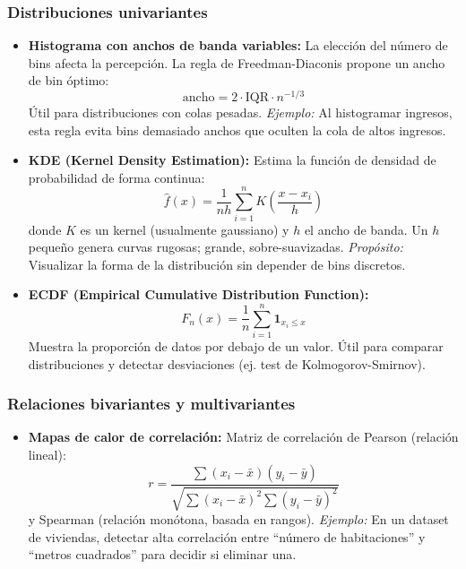 \documentclass[12pt,a4paper,openany,oneside]{book}
\begin{document}
\subsubsection{Distribuciones univariantes}
\begin{itemize}
    \item \textbf{Histograma con anchos de banda variables:} La elección del número de bins afecta la percepción. La regla de Freedman-Diaconis propone un ancho de bin óptimo:
    \[
    \text{ancho} = 2 \cdot \text{IQR} \cdot n^{-1/3}
    \]
    Útil para distribuciones con colas pesadas. \textit{Ejemplo:} Al histogramar ingresos, esta regla evita bins demasiado anchos que oculten la cola de altos ingresos.

    \item \textbf{KDE (Kernel Density Estimation):} Estima la función de densidad de probabilidad de forma continua:
    \[
    \hat{f}(x) = \frac{1}{nh}\sum_{i=1}^n K\left(\frac{x-x_i}{h}\right)
    \]
    donde $K$ es un kernel (usualmente gaussiano) y $h$ el ancho de banda. Un $h$ pequeño genera curvas rugosas; grande, sobre-suavizadas. \textit{Propósito:} Visualizar la forma de la distribución sin depender de bins discretos.

    \item \textbf{ECDF (Empirical Cumulative Distribution Function):}
    \[
    F_n(x) = \frac{1}{n}\sum_{i=1}^n \mathbf{1}_{x_i \leq x}
    \]
    Muestra la proporción de datos por debajo de un valor. Útil para comparar distribuciones y detectar desviaciones (ej. test de Kolmogorov-Smirnov).
\end{itemize}

\subsubsection{Relaciones bivariantes y multivariantes}
\begin{itemize}
    \item \textbf{Mapas de calor de correlación:} Matriz de correlación de Pearson (relación lineal):
    \[
    r = \frac{\sum (x_i - \bar{x})(y_i - \bar{y})}{\sqrt{\sum (x_i - \bar{x})^2 \sum (y_i - \bar{y})^2}}
    \]
    y Spearman (relación monótona, basada en rangos). \textit{Ejemplo:} En un dataset de viviendas, detectar alta correlación entre ``número de habitaciones'' y ``metros cuadrados'' para decidir si eliminar una.
\end{itemize}
\end{document}
